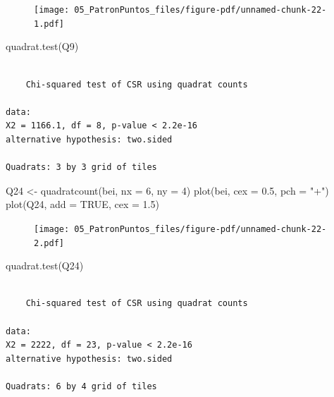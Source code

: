 \documentclass[
  letterpaper,
  DIV=11,
  numbers=noendperiod]{scrreprt}
\newenvironment{Shaded}{\begin{snugshade}}{\end{snugshade}}
\newcommand{\AttributeTok}[1]{\textcolor[rgb]{0.40,0.45,0.13}{#1}}
\newcommand{\ConstantTok}[1]{\textcolor[rgb]{0.56,0.35,0.01}{#1}}
\newcommand{\DecValTok}[1]{\textcolor[rgb]{0.68,0.00,0.00}{#1}}
\newcommand{\FloatTok}[1]{\textcolor[rgb]{0.68,0.00,0.00}{#1}}
\newcommand{\FunctionTok}[1]{\textcolor[rgb]{0.28,0.35,0.67}{#1}}
\newcommand{\NormalTok}[1]{\textcolor[rgb]{0.00,0.23,0.31}{#1}}
\newcommand{\OtherTok}[1]{\textcolor[rgb]{0.00,0.23,0.31}{#1}}
\newcommand{\StringTok}[1]{\textcolor[rgb]{0.13,0.47,0.30}{#1}}
\begin{document}
\begin{figure}[H]

{\centering \texttt{[image: 05\_PatronPuntos\_files/figure-pdf/unnamed-chunk-22-1.pdf]}

}

\end{figure}

\begin{Shaded}
\begin{Highlighting}[]
\FunctionTok{quadrat.test}\NormalTok{(Q9)}
\end{Highlighting}
\end{Shaded}

\begin{verbatim}

    Chi-squared test of CSR using quadrat counts

data:  
X2 = 1166.1, df = 8, p-value < 2.2e-16
alternative hypothesis: two.sided

Quadrats: 3 by 3 grid of tiles
\end{verbatim}

\begin{Shaded}
\begin{Highlighting}[]
\NormalTok{Q24 }\OtherTok{\textless{}{-}} \FunctionTok{quadratcount}\NormalTok{(bei, }\AttributeTok{nx =} \DecValTok{6}\NormalTok{, }\AttributeTok{ny =} \DecValTok{4}\NormalTok{)}
\FunctionTok{plot}\NormalTok{(bei,  }\AttributeTok{cex =} \FloatTok{0.5}\NormalTok{, }\AttributeTok{pch =} \StringTok{"+"}\NormalTok{)}
\FunctionTok{plot}\NormalTok{(Q24, }\AttributeTok{add =} \ConstantTok{TRUE}\NormalTok{, }\AttributeTok{cex =} \FloatTok{1.5}\NormalTok{)}
\end{Highlighting}
\end{Shaded}

\begin{figure}[H]

{\centering \texttt{[image: 05\_PatronPuntos\_files/figure-pdf/unnamed-chunk-22-2.pdf]}

}

\end{figure}

\begin{Shaded}
\begin{Highlighting}[]
\FunctionTok{quadrat.test}\NormalTok{(Q24)}
\end{Highlighting}
\end{Shaded}

\begin{verbatim}

    Chi-squared test of CSR using quadrat counts

data:  
X2 = 2222, df = 23, p-value < 2.2e-16
alternative hypothesis: two.sided

Quadrats: 6 by 4 grid of tiles
\end{verbatim}
\end{document}
